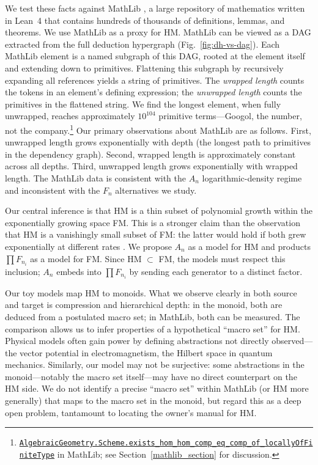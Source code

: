 \documentclass[12pt]{amsart}
\theoremstyle{definition}
\theoremstyle{remark}
\begin{document}
We test these facts against MathLib \cite{mathlib2020}, a large repository of mathematics written in Lean~4 \cite{Lean4} that contains hundreds of thousands of definitions, lemmas, and theorems.
We use MathLib as a proxy for HM.
MathLib can be viewed as a DAG extracted from the full deduction hypergraph (Fig.~\ref{fig:dh-vs-dag}).
Each MathLib element is a named subgraph of this DAG, rooted at the element itself and extending down to primitives.
Flattening this subgraph by recursively expanding all references yields a string of primitives.
The \emph{wrapped length} counts the tokens in an element's defining expression; 
the \emph{unwrapped length} counts the primitives in the flattened string.
We find the longest element, when fully unwrapped, reaches approximately $10^{104}$ primitive terms---Googol, the number, not the company.\footnote{\raggedright 
\href{https://github.com/leanprover-community/mathlib4/blob/d167cc6dc962ab340507362ea2f4bcfcff44f01b/Mathlib/AlgebraicGeometry/AffineTransitionLimit.lean\#L423}{\texttt{AlgebraicGeometry.Scheme.exists\_hom\_hom\_comp\_eq\_comp\_of\_locallyOfFiniteType}} in MathLib; see Section~\ref{mathlib_section} for discussion.}
Our primary observations about MathLib are as follows.
First, unwrapped length grows exponentially with depth (the longest path to primitives in the dependency graph).
Second, wrapped length is approximately constant across all depths.
Third, unwrapped length grows exponentially with wrapped length.
The MathLib data is consistent with the $A_n$ logarithmic-density regime and inconsistent with the $F_n$ alternatives we study. 

Our central inference is that HM is a thin subset of polynomial growth within the exponentially growing space FM.
This is a stronger claim than the observation that HM is a vanishingly small subset of FM: the latter would hold if both grew exponentially at different rates \cites{Shannon1948, CoverThomas2006}.
We propose $A_n$ as a model for HM and products $\prod F_{n_i}$ as a model for FM.
Since HM $\subset$ FM, the models must respect this inclusion; $A_n$ embeds into $\prod F_{n_i}$ by sending each generator to a distinct factor.

Our toy models map HM to monoids. 
What we observe clearly in both source and target is compression and hierarchical depth: in the monoid, both are deduced from a postulated macro set; in MathLib, both can be measured. 
The comparison allows us to infer properties of a hypothetical ``macro set'' for HM.
Physical models often gain power by defining abstractions not directly observed---the vector potential in electromagnetism, the Hilbert space in quantum mechanics. 
Similarly, our model may not be surjective: some abstractions in the monoid---notably the macro set itself---may have no direct counterpart on the HM side.
We do not identify a precise ``macro set'' within MathLib (or HM more generally) that maps to the macro set in the monoid, but regard this as a deep open problem, tantamount to locating the owner's manual for HM.
\end{document}
